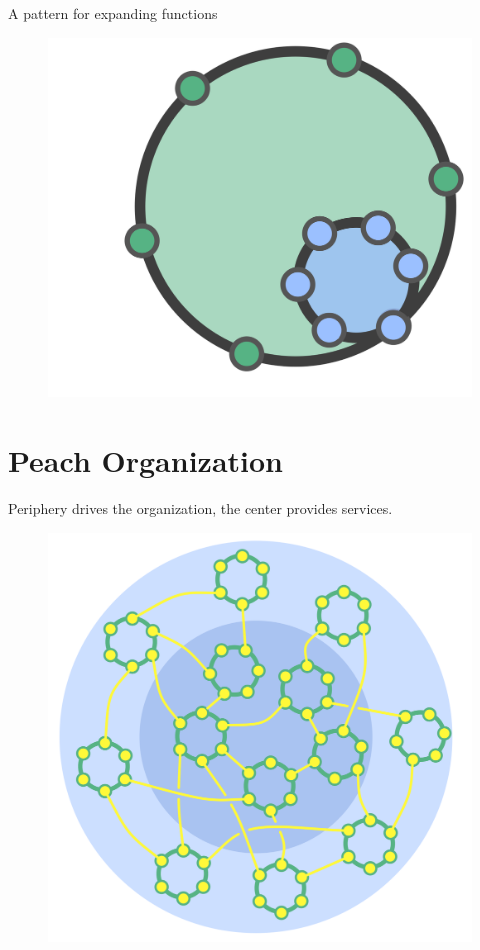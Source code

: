 A pattern for expanding functions

\begin{figure}[htbp]
\centering
\includegraphics[keepaspectratio,width=\textwidth,height=0.75\textheight]{img/structural-patterns/nested-circle.png}
\end{figure}

\section{Peach Organization}
\label{peachorganization}

Periphery drives the organization, the center provides services.

\begin{figure}[htbp]
\centering
\includegraphics[keepaspectratio,width=\textwidth,height=0.75\textheight]{img/structural-patterns/peach-organization.png}
\end{figure}

